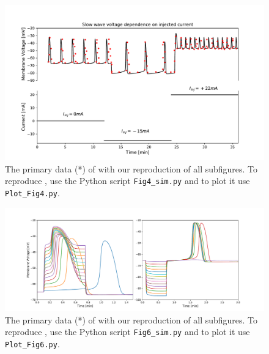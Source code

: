 \documentclass[fleqn,10pt]{physiome}
\begin{document}
\begin{figure}[ht!]%
\includegraphics[width=1.0\linewidth]{Figure_4.pdf}
\caption{The primary data (*) of \cite[Figure 4A]{imtiaz2002theoretical} with our reproduction of all subfigures. To reproduce \cite[Figure 4A]{imtiaz2002theoretical}, use the Python script \texttt{Fig4\_sim.py} and to plot it use \texttt{Plot\_Fig4.py}.}
\label{fig:fig4}
\end{figure}

\begin{figure}[ht!]%
\includegraphics[width=1.0\linewidth]{Figure_6.pdf}
\caption{The primary data (*) of \cite[Figure 6(A and B)]{imtiaz2002theoretical} with our reproduction of all subfigures. To reproduce \cite[Figure 6(A and B)]{imtiaz2002theoretical}, use the Python script \texttt{Fig6\_sim.py} and to plot it use \texttt{Plot\_Fig6.py}.}
\label{fig:fig6}
\end{figure}
\end{document}

